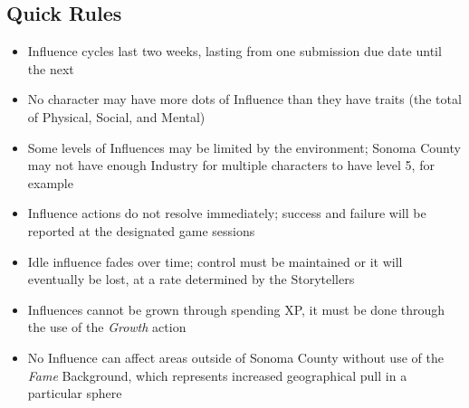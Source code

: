 \subsection{Quick Rules}
\begin{itemize}
	\item Influence cycles last two weeks, lasting from one submission due date until the next
	\item No character may have more dots of Influence than they have traits (the total of 
	Physical, Social, and Mental)
	\item Some levels of Influences may be limited by the environment; Sonoma County may not 
	have enough Industry for multiple characters to have level 5, for example
	\item Influence actions do not resolve immediately; success and failure will be reported 
	at the designated game sessions
	\item Idle influence fades over time; control must be maintained or it will eventually 
	be lost, at a rate determined by the Storytellers
	\item Influences cannot be grown through spending XP, it must be done through the use of 
	the \emph{Growth} action
	\item No Influence can affect areas outside of Sonoma County without use of the \emph{Fame} 
	Background, which represents increased geographical pull in a particular sphere
\end{itemize}